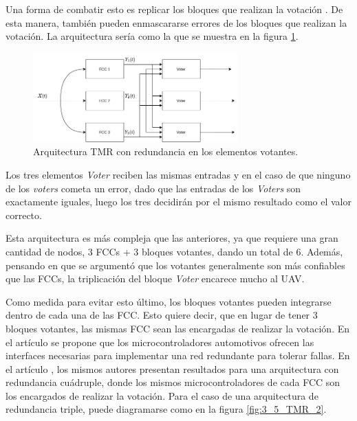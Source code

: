 Una forma de combatir esto es replicar los bloques que realizan la votación \cite{nelson1990fault}\cite{lyons1962use}. De esta manera, también pueden enmascararse errores de los bloques que realizan la votación. La arquitectura sería como la que se muestra en la figura \ref{fig:3_3_2_consenso_1}.

\begin{figure}[H]
    \centering
    \includegraphics[width=0.7\textwidth]{img/3_4_2_consenso_1.png}
    \caption{Arquitectura TMR con redundancia en los elementos votantes.}
    \label{fig:3_3_2_consenso_1}
\end{figure}

Los tres elementos \textit{Voter} reciben las mismas entradas y en el caso de que ninguno de los \textit{voters} cometa un error, dado que las entradas de los \textit{Voters} son exactamente iguales, luego los tres decidirán por el mismo resultado como el valor correcto.

Esta arquitectura es más compleja que las anteriores, ya que requiere una gran cantidad de nodos, 3 FCCs + 3 bloques votantes, dando un total de 6. Además, pensando en que se argumentó que los votantes generalmente son más confiables que las FCCs, la triplicación del bloque \textit{Voter} encarece mucho al UAV.


Como medida para evitar esto último, los bloques votantes pueden integrarse dentro de cada una de las FCC. Esto quiere decir, que en lugar de tener 3 bloques votantes, las mismas FCC sean las encargadas de realizar la votación. En el artículo \cite{hiergeist2017internal} se propone que los microcontroladores automotivos ofrecen las interfaces necesarias para implementar una red redundante para tolerar fallas. En el artículo \cite{hiergeist2018implementation}, los mismos autores presentan resultados para una arquitectura con redundancia cuádruple, donde los mismos microcontroladores de cada FCC son los encargados de realizar la votación. Para el caso de una arquitectura de redundancia triple, puede diagramarse como en la figura \ref{fig:3_5_TMR_2}.

